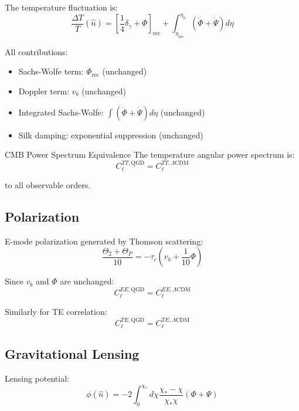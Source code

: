 \documentclass[11pt,a4paper]{article}
\theoremstyle{definition}
\theoremstyle{remark}
\begin{document}
	The temperature fluctuation is:
	\begin{equation}
		\frac{\Delta T}{T}(\hat{n}) = \left[\frac{1}{4}\delta_\gamma + \Phi\right]_{\text{rec}} + \int_{\eta_{\text{rec}}}^{\eta_0}(\dot{\Phi} + \dot{\Psi})d\eta
	\end{equation}
	
	All contributions:
	\begin{itemize}
		\item Sachs-Wolfe term: $\Phi_{\text{rec}}$ (unchanged)
		\item Doppler term: $v_b$ (unchanged)
		\item Integrated Sachs-Wolfe: $\int(\dot{\Phi} + \dot{\Psi})d\eta$ (unchanged)
		\item Silk damping: exponential suppression (unchanged)
	\end{itemize}
	
	CMB Power Spectrum Equivalence
		The temperature angular power spectrum is:
		\begin{equation}
			\boxed{C_\ell^{TT, \text{QGD}} = C_\ell^{TT, \Lambda\text{CDM}}}
		\end{equation}
		
		to all observable orders.
	
	\subsection{Polarization}
	
	E-mode polarization generated by Thomson scattering:
	\begin{equation}
		\frac{\Theta_2 + \Theta_P}{10} = -\tau_c(v_b + \frac{1}{10}\Phi)
	\end{equation}
	
	Since $v_b$ and $\Phi$ are unchanged:
	\begin{equation}
		\boxed{C_\ell^{EE, \text{QGD}} = C_\ell^{EE, \Lambda\text{CDM}}}
	\end{equation}
	
	Similarly for TE correlation:
	\begin{equation}
		\boxed{C_\ell^{TE, \text{QGD}} = C_\ell^{TE, \Lambda\text{CDM}}}
	\end{equation}
	
	\subsection{Gravitational Lensing}
	
	Lensing potential:
	\begin{equation}
		\phi(\hat{n}) = -2\int_0^{\chi_*}d\chi\frac{\chi_* - \chi}{\chi_*\chi}(\Phi + \Psi)
	\end{equation}
	
\end{document}
